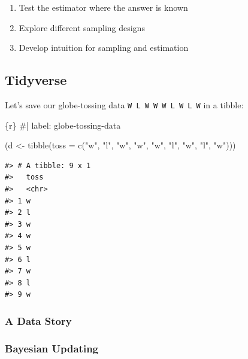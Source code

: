 \documentclass[
  letterpaper,
  DIV=11,
  numbers=noendperiod]{scrreprt}
\newenvironment{Shaded}{\begin{snugshade}}{\end{snugshade}}
\newcommand{\AttributeTok}[1]{\textcolor[rgb]{0.40,0.45,0.13}{#1}}
\newcommand{\CommentTok}[1]{\textcolor[rgb]{0.37,0.37,0.37}{#1}}
\newcommand{\FunctionTok}[1]{\textcolor[rgb]{0.28,0.35,0.67}{#1}}
\newcommand{\InformationTok}[1]{\textcolor[rgb]{0.37,0.37,0.37}{#1}}
\newcommand{\NormalTok}[1]{\textcolor[rgb]{0.00,0.23,0.31}{#1}}
\newcommand{\OtherTok}[1]{\textcolor[rgb]{0.00,0.23,0.31}{#1}}
\newcommand{\StringTok}[1]{\textcolor[rgb]{0.13,0.47,0.30}{#1}}
\providecommand{\tightlist}{%
  \setlength{\itemsep}{0pt}\setlength{\parskip}{0pt}}\usepackage{longtable,booktabs,array}
\begin{document}
\begin{enumerate}
\def\labelenumi{\arabic{enumi}.}
\tightlist
\item
  Test the estimator where the answer is known
\item
  Explore different sampling designs
\item
  Develop intuition for sampling and estimation
\end{enumerate}

\hypertarget{tidyverse-2}{%
\subsection{Tidyverse}\label{tidyverse-2}}

Let's save our globe-tossing data \texttt{W\ L\ W\ W\ W\ L\ W\ L\ W} in
a tibble:

\begin{Shaded}
\begin{Highlighting}[]
\InformationTok{\textasciigrave{}\textasciigrave{}\textasciigrave{}\{r\}}
\CommentTok{\#| label: globe{-}tossing{-}data}

\NormalTok{(d }\OtherTok{\textless{}{-}} \FunctionTok{tibble}\NormalTok{(}\AttributeTok{toss =} \FunctionTok{c}\NormalTok{(}\StringTok{"w"}\NormalTok{, }\StringTok{"l"}\NormalTok{, }\StringTok{"w"}\NormalTok{, }\StringTok{"w"}\NormalTok{, }\StringTok{"w"}\NormalTok{, }\StringTok{"l"}\NormalTok{, }\StringTok{"w"}\NormalTok{, }\StringTok{"l"}\NormalTok{, }\StringTok{"w"}\NormalTok{)))}
\InformationTok{\textasciigrave{}\textasciigrave{}\textasciigrave{}}
\end{Highlighting}
\end{Shaded}

\begin{verbatim}
#> # A tibble: 9 x 1
#>   toss 
#>   <chr>
#> 1 w    
#> 2 l    
#> 3 w    
#> 4 w    
#> 5 w    
#> 6 l    
#> 7 w    
#> 8 l    
#> 9 w
\end{verbatim}

\hypertarget{a-data-story-1}{%
\subsubsection{A Data Story}\label{a-data-story-1}}

\hypertarget{sec-expand_grid}{%
\subsubsection{Bayesian Updating}\label{sec-expand_grid}}
\end{document}
